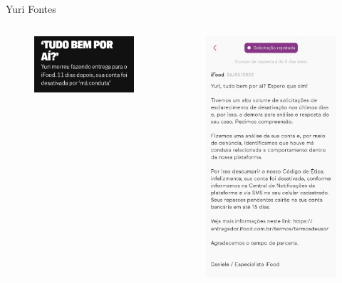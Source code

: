 \documentclass{beamer}
\begin{document}
\begin{frame}{Yuri Fontes}
    \begin{columns}
        \begin{column}{0.5\textwidth}
            \begin{figure}
                \centering
                \includegraphics[width=1\linewidth]{img/yuri.png}
            \end{figure}
        \end{column}
        \begin{column}{0.5\textwidth}
            \begin{figure}
                \centering
                \includegraphics[width=0.5\linewidth]{img/Notificacao-de-Bloquei.png}
            \end{figure}
        \end{column}
    \end{columns}
\end{frame}
\end{document}
